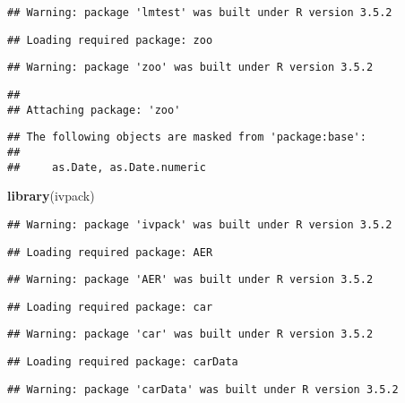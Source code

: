 \documentclass[]{article}
\newenvironment{Shaded}{\begin{snugshade}}{\end{snugshade}}
\newcommand{\KeywordTok}[1]{\textcolor[rgb]{0.13,0.29,0.53}{\textbf{#1}}}
\newcommand{\NormalTok}[1]{#1}
\begin{document}
\begin{verbatim}
## Warning: package 'lmtest' was built under R version 3.5.2
\end{verbatim}

\begin{verbatim}
## Loading required package: zoo
\end{verbatim}

\begin{verbatim}
## Warning: package 'zoo' was built under R version 3.5.2
\end{verbatim}

\begin{verbatim}
## 
## Attaching package: 'zoo'
\end{verbatim}

\begin{verbatim}
## The following objects are masked from 'package:base':
## 
##     as.Date, as.Date.numeric
\end{verbatim}

\begin{Shaded}
\begin{Highlighting}[]
\KeywordTok{library}\NormalTok{(ivpack)}
\end{Highlighting}
\end{Shaded}

\begin{verbatim}
## Warning: package 'ivpack' was built under R version 3.5.2
\end{verbatim}

\begin{verbatim}
## Loading required package: AER
\end{verbatim}

\begin{verbatim}
## Warning: package 'AER' was built under R version 3.5.2
\end{verbatim}

\begin{verbatim}
## Loading required package: car
\end{verbatim}

\begin{verbatim}
## Warning: package 'car' was built under R version 3.5.2
\end{verbatim}

\begin{verbatim}
## Loading required package: carData
\end{verbatim}

\begin{verbatim}
## Warning: package 'carData' was built under R version 3.5.2
\end{verbatim}
\end{document}

